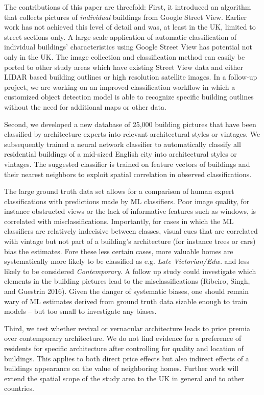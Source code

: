 \documentclass[]{article}
\begin{document}
The contributions of this paper are threefold: First, it introduced an
algorithm that collects pictures of \emph{individual} buildings from
Google Street View. Earlier work has not achieved this level of detail
and was, at least in the UK, limited to street sections only. A
large-scale application of automatic classification of individual
buildings' characteristics using Google Street View has potential not
only in the UK. The image collection and classification method can
easily be ported to other study areas which have existing Street View
data and either LIDAR based building outlines or high resolution
satellite images. In a follow-up project, we are working on an improved
classification workflow in which a customized object detection model is
able to recognize specific building outlines without the need for
additional maps or other data.

Second, we developed a new database of 25,000 building pictures that
have been classified by architecture experts into relevant architectural
styles or vintages. We subsequently trained a neural network classifier
to automatically classify all residential buildings of a mid-sized
English city into architectural styles or vintages. The suggested
classifier is trained on feature vectors of buildings and their nearest
neighbors to exploit spatial correlation in observed classifications.

The large ground truth data set allows for a comparison of human expert
classifications with predictions made by ML classifiers. Poor image
quality, for instance obstructed views or the lack of informative
features such as windows, is correlated with misclassifications.
Importantly, for cases in which the ML classifiers are relatively
indecisive between classes, visual cues that are correlated with vintage
but not part of a building's architecture (for instance trees or cars)
bias the estimates. Fore these less certain cases, more valuable homes
are systematically more likely to be classified as e.g. \emph{Late
Victorian/Edw.} and less likely to be considered \emph{Contemporary}. A
follow up study could investigate which elements in the building
pictures lead to the misclassifications (Ribeiro, Singh, and Guestrin
2016). Given the danger of systematic biases, one should remain wary of
ML estimates derived from ground truth data sizable enough to train
models -- but too small to investigate any biases.

Third, we test whether revival or vernacular architecture leads to price
premia over contemporary architecture. We do not find evidence for a
preference of residents for specific architecture after controlling for
quality and location of buildings. This applies to both direct price
effects but also indirect effects of a buildings appearance on the value
of neighboring homes. Further work will extend the spatial scope of the
study area to the UK in general and to other countries.
\end{document}
